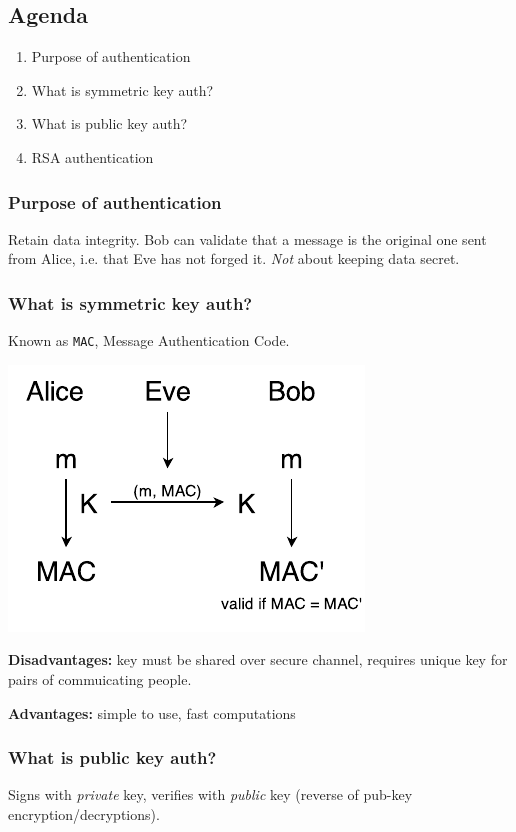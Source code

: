 
\subsection{Agenda}
\begin{enumerate}
\item Purpose of authentication
\item What is symmetric key auth?
\item What is public key auth?
\item RSA authentication
\end{enumerate}

\subsubsection{Purpose of authentication}
Retain data integrity. Bob can validate that a message is the original one sent from Alice, i.e. that Eve has not forged it. \emph{Not} about keeping data secret.

\subsubsection{What is symmetric key auth?}
Known as \texttt{MAC}, Message Authentication Code.

\begin{center}
\includegraphics{images/2-sym-AB.pdf}
\end{center}

\textbf{Disadvantages:} key must be shared over secure channel, requires unique key for pairs of commuicating people.

\textbf{Advantages:} simple to use, fast computations

\subsubsection{What is public key auth?}
Signs with \emph{private} key, verifies with \emph{public} key (reverse of pub-key encryption/decryptions).

